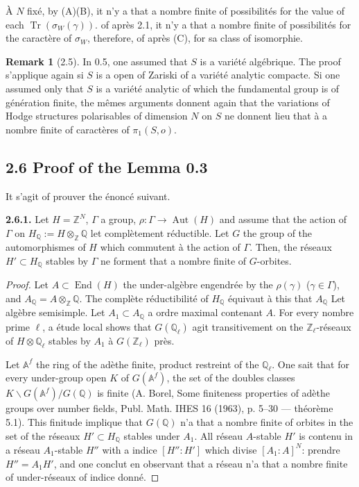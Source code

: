 \documentclass[12pt,a4paper]{article}
\theoremstyle{plain}
\theoremstyle{definition}
\newtheorem{remark}{Remark}[section]
\DeclareMathOperator{\Tr}{Tr}
\DeclareMathOperator{\End}{End}
\DeclareMathOperator{\Aut}{Aut}
\newcommand{\QQ}{\mathbb{Q}}
\newcommand{\ZZ}{\mathbb{Z}}
\begin{document}
{\`{A} $N$ fix\'{e}, by (A)(B), it n'y a that a nombre finite of possibilit\'{e}s for the value of each $\Tr(\sigma_{W}(\gamma))$. of apr\`{e}s 2.1, it n'y a that a nombre finite of possibilit\'{e}s for the caract\`{e}re of $\sigma_{W}$, therefore, of apr\`{e}s (C), for sa class of isomorphie.

\begin{remark}[2.5]
In 0.5, one assumed that $S$ is a vari\'{e}t\'{e} alg\'{e}brique. The proof s'applique again si $S$ is a open of Zariski of a vari\'{e}t\'{e} analytic compacte. Si one assumed only that $S$ is a vari\'{e}t\'{e} analytic of which the fundamental group is of g\'{e}n\'{e}ration finite, the m\^{e}mes arguments donnent again that the variations of Hodge structures polarisables of dimension $N$ on $S$ ne donnent lieu that \`{a} a nombre finite of caract\`{e}res of $\pi_{1}(S,o)$.
\end{remark}

\subsection*{2.6 Proof of the Lemma 0.3}
It s'agit of prouver the \'{e}nonc\'{e} suivant.

\textbf{2.6.1.} Let $H = \ZZ^{N}$, $\Gamma$ a group, $\rho : \Gamma \to \Aut(H)$ and assume that the action of $\Gamma$ on $H_{\QQ} := H \otimes_{\ZZ} \QQ$ let compl\`{e}tement r\'{e}ductible. Let $G$ the group of the automorphismes of $H$ which commutent \`{a} the action of $\Gamma$. Then, the r\'{e}seaux $H' \subset H_{\QQ}$ stables by $\Gamma$ ne forment that a nombre finite of $G$-orbites.

\begin{proof}
Let $A \subset \End(H)$ the under-alg\`{e}bre engendr\'{e}e by the $\rho(\gamma)$ ($\gamma \in \Gamma$), and $A_{\QQ} = A \otimes_{\ZZ} \QQ$. The compl\`{e}te r\'{e}ductibilit\'{e} of $H_{\QQ}$ \'{e}quivaut \`{a} this that $A_{\QQ}$ Let alg\`{e}bre semisimple. Let $A_{1} \subset A_{\QQ}$ a ordre maximal contenant $A$. For every nombre prime $\ell$, a \'{e}tude local shows that $G(\QQ_{\ell})$ agit transitivement on the $\ZZ_{\ell}$-r\'{e}seaux of $H \otimes \QQ_{\ell}$ stables by $A_{1}$ \`{a} $G(\ZZ_{\ell})$ pr\`{e}s.

Let $\mathbb{A}^{f}$ the ring of the ad\`{e}the finite, product restreint of the $\QQ_{\ell}$. One sait that for every under-group open $K$ of $G(\mathbb{A}^{f})$, the set of the doubles classes $K \backslash G(\mathbb{A}^{f}) / G(\QQ)$ is finite (A. Borel, Some finiteness properties of ad\`{e}the groups over number fields, Publ. Math. IHES 16 (1963), p. 5--30 --- th\'{e}or\`{e}me 5.1). This finitude implique that $G(\QQ)$ n'a that a nombre finite of orbites in the set of the r\'{e}seaux $H' \subset H_{\QQ}$ stables under $A_{1}$. All r\'{e}seau $A$-stable $H'$ is contenu in a r\'{e}seau $A_{1}$-stable $H''$ with a indice $[H'':H']$ which divise $[A_{1}:A]^{N}$: prendre $H'' = A_{1}H'$, and one conclut en observant that a r\'{e}seau n'a that a nombre finite of under-r\'{e}seaux of indice donn\'{e}.
\end{proof}


}
\end{document}
